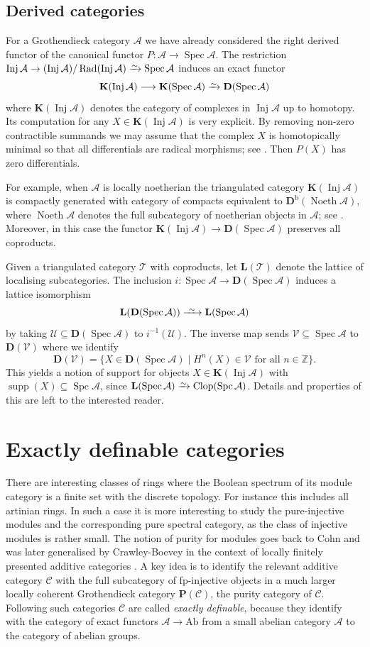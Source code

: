 \documentclass[a4paper]{amsart}
\theoremstyle{plain}
\theoremstyle{definition}
\theoremstyle{remark}
\numberwithin{equation}{section}
\newcommand{\Clop}{\operatorname{Clop}}
\newcommand{\Inj}{\operatorname{Inj}}
\newcommand{\Noeth}{\operatorname{Noeth}}
\newcommand{\Rad}{\operatorname{Rad}}
\newcommand{\Spc}{\operatorname{Spc}}
\newcommand{\Spec}{\operatorname{Spec}}
\newcommand{\supp}{\operatorname{supp}}
\newcommand{\Ab}{\mathrm{Ab}}
\newcommand{\iso}{\xrightarrow{\raisebox{-.4ex}[0ex][0ex]{$\scriptstyle{\sim}$}}}
\newcommand{\longiso}{\xrightarrow{\ \raisebox{-.4ex}[0ex][0ex]{$\scriptstyle{\sim}$}\ }}
\newcommand{\lto}{\longrightarrow}
\def\A{\mathcal A}
\def\C{\mathcal C}
\def\T{\mathcal T}
\def\U{\mathcal U}
\def\V{\mathcal V}
\def\bfD{\mathbf D}
\def\bfK{\mathbf K}
\def\bfL{\mathbf L}
\def\bfP{\mathbf P}
\def\bbZ{\mathbb Z}
\begin{document}
\subsection*{Derived categories}

For a Grothendieck category $\A$ we have already considered the right
derived functor of the canonical functor $P\colon\A\to\Spec\A$. The
restriction $\Inj\A\to(\Inj\A)/\Rad(\Inj\A)\iso\Spec\A$ induces an
exact functor
\[\bfK(\Inj\A)\lto\bfK(\Spec\A)\iso\bfD(\Spec\A)\]
where $\bfK(\Inj\A)$ denotes the category of complexes in $\Inj\A$ up
to homotopy.  Its computation for any $X\in\bfK(\Inj\A)$ is very
explicit. By removing non-zero contractible summands we may assume
that the complex $X$ is homotopically minimal so that all
differentials are radical morphisms; see
\cite[Proposition~4.3.18]{Kr2022}. Then $P(X)$ has zero differentials.

For example, when $\A$ is locally noetherian the triangulated category
$\bfK(\Inj\A)$ is compactly generated with
category of compacts equivalent to $\bfD^{\mathrm b}(\Noeth\A)$, where
$\Noeth\A$ denotes the full subcategory of noetherian objects in $\A$;
see \cite{Kr2005}. Moreover, in this case the functor
$\bfK(\Inj\A)\to\bfD(\Spec\A)$ preserves all coproducts.

Given a triangulated category $\T$ with coproducts, let $\bfL(\T)$
denote the lattice of localising subcategories. The inclusion
$i\colon\Spec\A\to\bfD(\Spec\A)$ induces a lattice isomorphism
\[\bfL(\bfD(\Spec\A))\longiso\bfL(\Spec\A)\]
by taking $\U\subseteq \bfD(\Spec\A)$ to $i^{-1}(\U)$. The inverse map
sends $\V\subseteq\Spec\A$ to $\bfD(\V)$ where we identify
\[\bfD(\V)=\{X\in\bfD(\Spec\A)\mid  H^n(X)\in\V\text{ for all
  }n\in\bbZ\}.\] This yields a notion of support for objects
$X\in\bfK(\Inj\A)$ with $\supp(X)\subseteq\Spc\A$, since
$\bfL(\Spec\A)\iso\Clop(\Spc\A)$. Details and properties of this are
left to the interested reader.
  
\section{Exactly definable categories}\label{se:ext}

There are interesting classes of rings where the Boolean spectrum of
its module category is a finite set with the discrete topology. For
instance this includes all artinian rings. In such a case it is 
more interesting to study the pure-injective modules and the
corresponding pure spectral category, as the class of injective
modules is rather small.  The notion of purity for modules goes back to
Cohn \cite{Co1959} and was later generalised by Crawley-Boevey in the
context of locally finitely presented additive categories
\cite{CB1994}. A key idea is to identify the relevant additive
category $\C$ with the full subcategory of fp-injective objects in a
much larger locally coherent Grothendieck category $\bfP(\C)$, the
purity category of $\C$. Following \cite{Kr1998} such categories $\C$
are called \emph{exactly definable}, because they identify with the
category of exact functors $\A\to\Ab$ from a small abelian category
$\A$ to the category of abelian groups.
\end{document}
